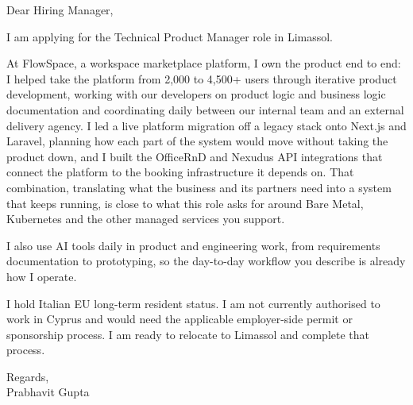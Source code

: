 \documentclass[a4paper,11pt]{article}
\begin{document}
Dear Hiring Manager,

I am applying for the Technical Product Manager role in Limassol.

At FlowSpace, a workspace marketplace platform, I own the product end to end: I helped take the platform from 2,000 to 4,500+ users through iterative product development, working with our developers on product logic and business logic documentation and coordinating daily between our internal team and an external delivery agency. I led a live platform migration off a legacy stack onto Next.js and Laravel, planning how each part of the system would move without taking the product down, and I built the OfficeRnD and Nexudus API integrations that connect the platform to the booking infrastructure it depends on. That combination, translating what the business and its partners need into a system that keeps running, is close to what this role asks for around Bare Metal, Kubernetes and the other managed services you support.

I also use AI tools daily in product and engineering work, from requirements documentation to prototyping, so the day-to-day workflow you describe is already how I operate.

I hold Italian EU long-term resident status. I am not currently authorised to work in Cyprus and would need the applicable employer-side permit or sponsorship process. I am ready to relocate to Limassol and complete that process.

Regards,\\
Prabhavit Gupta
\end{document}
